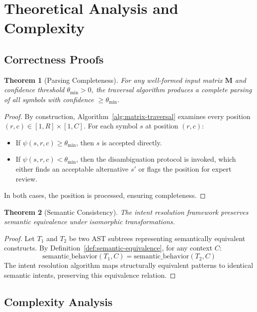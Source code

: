 \documentclass[11pt,a4paper]{article}
\newtheorem{theorem}{Theorem}[section]
\theoremstyle{definition}
\theoremstyle{remark}
\newcommand{\confidence}[3]{\ensuremath{\psi(#1, #2, #3)}}
\newcommand{\matrix}[1]{\ensuremath{\mathbf{#1}}}
\begin{document}
\section{Theoretical Analysis and Complexity}
\label{sec:theoretical-analysis}

\subsection{Correctness Proofs}
\label{subsec:correctness-proofs}

\begin{theorem}[Parsing Completeness]
\label{thm:parsing-completeness}
For any well-formed input matrix $\matrix{M}$ and confidence threshold $\theta_{\min} > 0$, the traversal algorithm produces a complete parsing of all symbols with confidence $\geq \theta_{\min}$.
\end{theorem}

\begin{proof}
By construction, Algorithm~\ref{alg:matrix-traversal} examines every position $(r,c) \in [1,R] \times [1,C]$. For each symbol $s$ at position $(r,c)$:
\begin{itemize}
\item If $\confidence{s}{r}{c} \geq \theta_{\min}$, then $s$ is accepted directly.
\item If $\confidence{s}{r}{c} < \theta_{\min}$, then the disambiguation protocol is invoked, which either finds an acceptable alternative $s'$ or flags the position for expert review.
\end{itemize}
In both cases, the position is processed, ensuring completeness.
\end{proof}

\begin{theorem}[Semantic Consistency]
\label{thm:semantic-consistency}
The intent resolution framework preserves semantic equivalence under isomorphic transformations.
\end{theorem}

\begin{proof}
Let $T_1$ and $T_2$ be two AST subtrees representing semantically equivalent constructs. By Definition~\ref{def:semantic-equivalence}, for any context $C$:
$$\text{semantic\_behavior}(T_1, C) = \text{semantic\_behavior}(T_2, C)$$
The intent resolution algorithm maps structurally equivalent patterns to identical semantic intents, preserving this equivalence relation.
\end{proof}

\subsection{Complexity Analysis}
\label{subsec:complexity-analysis}
\end{document}
